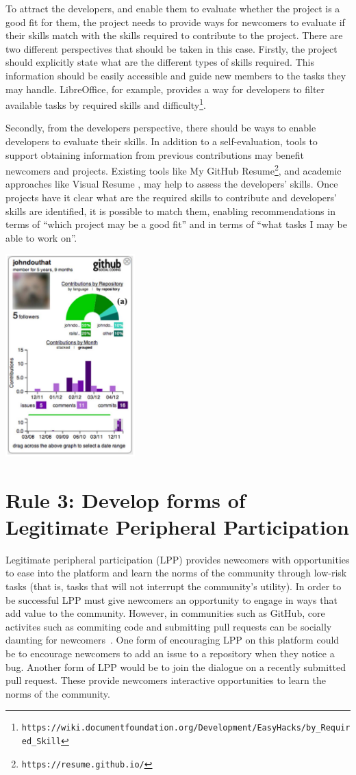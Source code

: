 \documentclass[10pt,letterpaper]{article}
\newcommand{\rulemajor}[1]{\section{#1}}
\newcommand{\withurl}[2]{{#1}\footnote{{\texttt{#2}}}}
\begin{document}
To attract the developers,
and enable them to evaluate whether the project is a good fit for them,
the project needs to provide ways for newcomers to evaluate if their skills match with the skills required to contribute to the project.
There are two different perspectives that should be taken in this case.
Firstly,
the project should explicitly state what are the different types of skills required.
This information should be easily accessible and guide new members to the tasks they may handle.
LibreOffice,
for example,
provides a way for developers to filter available tasks by
\withurl{required skills and difficulty}{https://wiki.documentfoundation.org/Development/EasyHacks/by\_Required\_Skill}.

Secondly,
from the developers perspective,
there should be ways to enable developers to evaluate their skills.
In addition to a self-evaluation,
tools to support obtaining information from previous contributions may benefit newcomers and projects.
Existing tools like \withurl{My GitHub Resume}{https://resume.github.io/},
and academic approaches like Visual Resume \cite{sarma2016},
may help to assess the developers' skills.
Once projects have it clear what are the required skills to contribute and developers' skills are identified,
it is possible to match them,
enabling recommendations in terms of ``which project may be a good fit''
and in terms of ``what tasks I may be able to work on''.

\includegraphics[width=5.0cm]{contributions.png}

\rulemajor{Rule 3: Develop forms of Legitimate Peripheral Participation}

Legitimate peripheral participation (LPP) provides newcomers with opportunities to ease into the platform and learn the norms of the community through low-risk tasks
(that is, tasks that will not interrupt the community’s utility).
In order to be successful LPP must give newcomers an opportunity to engage in ways that add value to the community.
However,
in communities such as GitHub,
core activites such as commiting code and submitting pull requests can be socially daunting for newcomers~\cite{steinmacher2015}.
One form of encouraging LPP on this platform could be to encourage newcomers to add an issue to a repository when they notice a bug.
Another form of LPP would be to join the dialogue on a recently submitted pull request.
These provide newcomers interactive opportunities to learn the norms of the community. 
\end{document}
